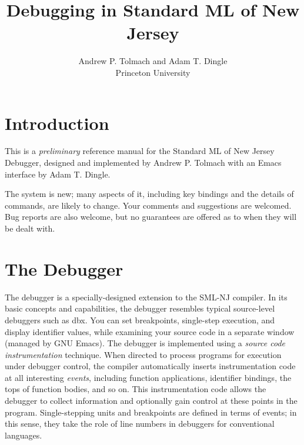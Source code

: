 \setlength{\textheight}{8.8in}
\setlength{\textwidth}{6.5in}
\setlength{\oddsidemargin}{0in}
\setlength{\topmargin}{-.1in}
\setlength{\headheight}{0in}
\setlength{\headsep}{0in}

\title{Debugging in Standard ML of New Jersey}
\author{Andrew P. Tolmach
and Adam T. Dingle \\ Princeton University}

\maketitle
\section{Introduction}
This is a {\em preliminary} reference manual for the Standard ML of New Jersey 
Debugger, designed and implemented by Andrew P. Tolmach with an Emacs interface
by Adam T. Dingle.  

The system is new; many aspects of it, including key bindings and the details
of commands, are likely to change.  Your comments and suggestions are welcomed.
Bug reports are also welcome, but no guarantees are offered as to when 
they will be dealt with.

\section{The Debugger}
The debugger is a specially-designed extension to the SML-NJ compiler.
In its basic concepts and capabilities, the debugger resembles typical 
source-level debuggers such as dbx.  You can set breakpoints, single-step 
execution, and display identifier values, while examining your source code 
in a separate window (managed by GNU Emacs).  The debugger is implemented
using a {\em source code instrumentation} technique.  When directed to 
process programs
for execution under debugger control, the compiler automatically inserts
instrumentation code at all interesting {\em events}, including function
applications, identifier bindings, the tops of function bodies, and so on.
This instrumentation code allows the debugger to collect information and 
optionally gain control at these points in the program.  Single-stepping 
units and breakpoints are defined in terms of events; in this sense, they
take the role of line numbers in debuggers for conventional languages.

